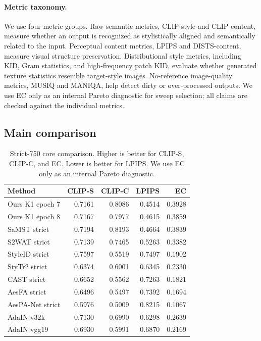 ﻿\documentclass[letterpaper]{article}
\begin{document}
\paragraph{Metric taxonomy.}
We use four metric groups. Raw semantic metrics, CLIP-style and CLIP-content, measure whether an output is recognized as stylistically aligned and semantically related to the input. Perceptual content metrics, LPIPS and DISTS-content, measure visual structure preservation. Distributional style metrics, including KID, Gram statistics, and high-frequency patch KID, evaluate whether generated texture statistics resemble target-style images. No-reference image-quality metrics, MUSIQ and MANIQA, help detect dirty or over-processed outputs. We use EC only as an internal Pareto diagnostic for sweep selection; all claims are checked against the individual metrics.

\subsection{Main comparison}
\begin{table}[t]
\centering
\caption{Strict-750 core comparison. Higher is better for CLIP-S, CLIP-C, and EC. Lower is better for LPIPS. We use EC only as an internal Pareto diagnostic.}
\label{tab:main}
\small
\setlength{\tabcolsep}{9pt}
\begin{tabular}{lrrrr}
\toprule
Method & CLIP-S & CLIP-C & LPIPS & EC \\
\midrule
Ours K1 epoch 7 & 0.7161 & 0.8086 & 0.4514 & 0.3928 \\
Ours K1 epoch 8 & 0.7167 & 0.7977 & 0.4615 & 0.3859 \\
SaMST strict & 0.7194 & 0.8193 & 0.4664 & 0.3839 \\
S2WAT strict & 0.7139 & 0.7465 & 0.5263 & 0.3382 \\
StyleID strict & 0.7597 & 0.5519 & 0.7497 & 0.1902 \\
StyTr2 strict & 0.6374 & 0.6001 & 0.6345 & 0.2330 \\
CAST strict & 0.6652 & 0.5562 & 0.7263 & 0.1821 \\
AesFA strict & 0.6496 & 0.5497 & 0.7392 & 0.1694 \\
AesPA-Net strict & 0.5976 & 0.5009 & 0.8215 & 0.1067 \\
AdaIN v32k & 0.7130 & 0.6990 & 0.6298 & 0.2639 \\
AdaIN vgg19 & 0.6930 & 0.5991 & 0.6870 & 0.2169 \\
\bottomrule
\end{tabular}
\end{table}
\end{document}
